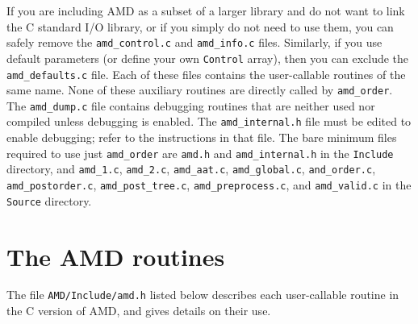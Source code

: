 \documentclass[11pt]{article}
\begin{document}
If you are including AMD as a subset of a larger library and do not want
to link the C standard I/O library, or if you simply do not need to use
them, you can safely remove the {\tt amd\_control.c} and {\tt amd\_info.c}
files.  Similarly, if you use default parameters (or define your
own {\tt Control} array), then you can exclude the {\tt amd\_defaults.c}
file.
Each of these files contains the user-callable routines of the same
name.  None of these auxiliary routines are directly called by
{\tt amd\_order}.
The {\tt amd\_dump.c} file contains debugging routines
that are neither used nor compiled unless debugging is enabled.
The {\tt amd\_internal.h} file must be edited to enable debugging;
refer to the instructions in that file.
The bare minimum files required to use just {\tt amd\_order} are
{\tt amd.h} and {\tt amd\_internal.h}
in the {\tt Include} directory,
and
{\tt amd\_1.c},
{\tt amd\_2.c},
{\tt amd\_aat.c},
{\tt amd\_global.c},
{\tt and\_order.c},
{\tt amd\_postorder.c},
{\tt amd\_post\_tree.c},
{\tt amd\_preprocess.c},
and
{\tt amd\_valid.c}
in the {\tt Source} directory.

\newpage
\section{The AMD routines}
\label{Primary}

The file {\tt AMD/Include/amd.h} listed below
describes each user-callable routine in the C version of AMD,
and gives details on their use.
\end{document}
